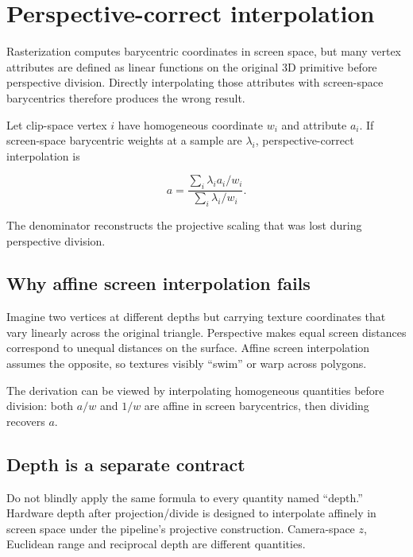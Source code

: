 \hypertarget{appendix-1ed5f96c73ea}{}\label{referencestart:appendix-1ed5f96c73ea}
\section{Perspective-correct interpolation}\label{appendix-1ed5f96c73ea-perspective-correct-interpolation}

Rasterization computes barycentric coordinates in screen space, but many vertex attributes are defined as linear functions on the original 3D primitive before perspective division. Directly interpolating those attributes with screen-space barycentrics therefore produces the wrong result.

Let clip-space vertex \(i\) have homogeneous coordinate \(w_i\) and attribute \(a_i\). If screen-space barycentric weights at a sample are \(\lambda_i\), perspective-correct interpolation is

\[
a=
\frac{
\sum_i \lambda_i a_i/w_i
}{
\sum_i \lambda_i /w_i
}.
\]

The denominator reconstructs the projective scaling that was lost during perspective division.

\subsection{Why affine screen interpolation fails}\label{appendix-1ed5f96c73ea-why-affine-screen-interpolation-fails}

Imagine two vertices at different depths but carrying texture coordinates that vary linearly across the original triangle. Perspective makes equal screen distances correspond to unequal distances on the surface. Affine screen interpolation assumes the opposite, so textures visibly ``swim'' or warp across polygons.

The derivation can be viewed by interpolating homogeneous quantities before division: both \(a/w\) and \(1/w\) are affine in screen barycentrics, then dividing recovers \(a\).

\subsection{Depth is a separate contract}\label{appendix-1ed5f96c73ea-depth-is-a-separate-contract}

Do not blindly apply the same formula to every quantity named ``depth.'' Hardware depth after projection/divide is designed to interpolate affinely in screen space under the pipeline's projective construction. Camera-space \(z\), Euclidean range and reciprocal depth are different quantities.

